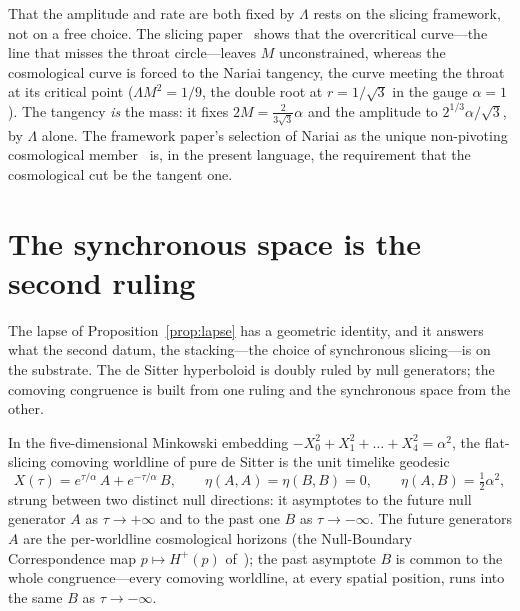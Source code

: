 \documentclass[11pt,a4paper]{article}
\theoremstyle{definition}
\begin{document}
That the amplitude and rate are both fixed by $\Lambda$ rests on the slicing framework, not on a free choice. The slicing paper~\cite{JanzenSlicing} shows that the overcritical curve---the line that misses the throat circle---leaves $M$ unconstrained, whereas the cosmological curve is forced to the Nariai tangency, the curve meeting the throat at its critical point ($\Lambda M^{2}=1/9$, the double root at $r=1/\sqrt{3}$ in the gauge $\alpha=1$). The tangency \emph{is} the mass: it fixes $2M=\frac{2}{3\sqrt3}\alpha$ and the amplitude to $2^{1/3}\alpha/\sqrt3$, by $\Lambda$ alone. The framework paper's selection of Nariai as the unique non-pivoting cosmological member~\cite{JanzenCRframework} is, in the present language, the requirement that the cosmological cut be the tangent one.

\section{The synchronous space is the second ruling}\label{sec:synchronous}

The lapse of Proposition~\ref{prop:lapse} has a geometric identity, and it answers what the second datum, the stacking---the choice of synchronous slicing---is on the substrate. The de Sitter hyperboloid is doubly ruled by null generators; the comoving congruence is built from one ruling and the synchronous space from the other.

In the five-dimensional Minkowski embedding $-X_{0}^{2}+X_{1}^{2}+\dots+X_{4}^{2}=\alpha^{2}$, the flat-slicing comoving worldline of pure de Sitter is the unit
timelike geodesic
\begin{equation}\label{eq:embed}
X(\tau)=e^{\tau/\alpha}\,A+e^{-\tau/\alpha}\,B,
\qquad \eta(A,A)=\eta(B,B)=0,
\qquad \eta(A,B)=\tfrac{1}{2}\alpha^{2},
\end{equation}
strung between two distinct null directions: it asymptotes to the future null generator $A$ as $\tau\to+\infty$ and to the past one $B$ as $\tau\to-\infty$. The future generators $A$ are the per-worldline cosmological horizons (the Null-Boundary Correspondence map $p\mapsto H^{+}(p)$ of~\cite{JanzenCRframework}); the past asymptote $B$ is common to the whole congruence---every comoving worldline, at every spatial position, runs into the same $B$ as $\tau\to-\infty$.
\end{document}
